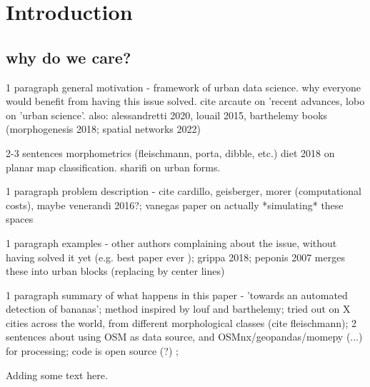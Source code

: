 \section{Introduction}
\label{sec:intro}

\subsection{why do we care?}

1 paragraph general motivation - framework of urban data science. why everyone would benefit from having this issue solved. cite arcaute on 'recent advances, lobo on 'urban science'. also: alessandretti 2020, louail 2015, barthelemy books (morphogenesis 2018; spatial networks 2022)

2-3 sentences morphometrics (fleischmann, porta, dibble, etc.) diet 2018 on planar map classification. sharifi on urban forms.

1 paragraph problem description - cite cardillo, geisberger, morer (computational costs), maybe venerandi 2016?; vanegas paper on actually *simulating* these spaces

1 paragraph examples - other authors complaining about the issue, without having solved it yet (e.g. best paper ever \citep{vybornova2022automated}); grippa 2018; peponis 2007 merges these into urban blocks (replacing by center lines)

1 paragraph summary of what happens in this paper - 'towards an automated detection of bananas';
method inspired by louf and barthelemy;
tried out on X cities across the world,
from different morphological classes (cite fleischmann);
2 sentences about using OSM as data source, and OSMnx/geopandas/momepy (...) for processing;
code is open source (?) ;

Adding some text here.